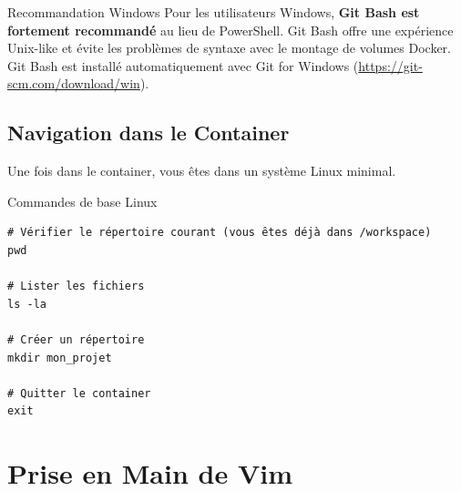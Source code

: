 \documentclass[10pt,a4paper]{article}
\begin{document}
\begin{infobox}{Recommandation Windows}
Pour les utilisateurs Windows, \textbf{Git Bash est fortement recommandé} au lieu de PowerShell. Git Bash offre une expérience Unix-like et évite les problèmes de syntaxe avec le montage de volumes Docker. Git Bash est installé automatiquement avec Git for Windows (\url{https://git-scm.com/download/win}).
\end{infobox}

\begin{center}
\end{center}

\subsection{Navigation dans le Container}

Une fois dans le container, vous êtes dans un système Linux minimal.

\begin{techbox}{Commandes de base Linux}
\begin{verbatim}
# Vérifier le répertoire courant (vous êtes déjà dans /workspace)
pwd

# Lister les fichiers
ls -la

# Créer un répertoire
mkdir mon_projet

# Quitter le container
exit
\end{verbatim}
\end{techbox}

\section{Prise en Main de Vim}
\end{document}
